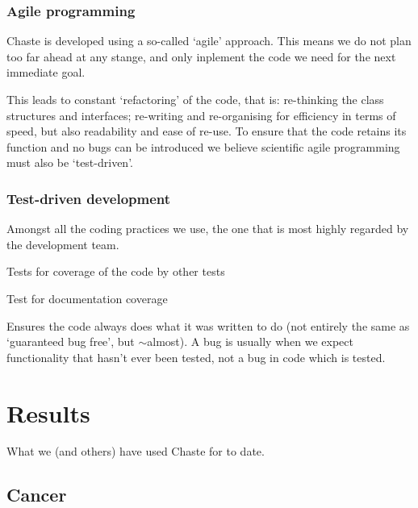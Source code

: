 \documentclass[10pt]{article}
\begin{document}
\subsubsection*{Agile programming}
Chaste is developed using a so-called `agile' approach. This means we do not plan too far ahead at any stange, and only inplement the code we need for the next immediate goal. 

This leads to constant `refactoring' of the code, that is: re-thinking the class structures and interfaces; re-writing and re-organising for efficiency in terms of speed, but also readability and ease of re-use. 
To ensure that the code retains its function and no bugs can be introduced we believe scientific agile programming must also be `test-driven'. 

\subsubsection*{Test-driven development}

Amongst all the coding practices we use, the one that is most highly regarded by the development team.

Tests for coverage of the code by other tests

Test for documentation coverage

Ensures the code always does what it was written to do (not entirely the same as `guaranteed bug free', but $\sim$almost). A bug is usually when we expect functionality that hasn't ever been tested, not a bug in code which is tested.

\section*{Results}

What we (and others) have used Chaste for to date.

\subsection*{Cancer}
\end{document}
